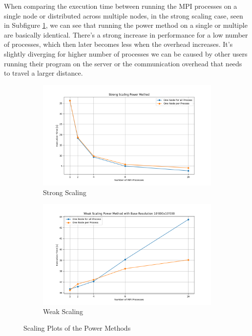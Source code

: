When comparing the execution time between running the MPI processes on a single node or distributed across multiple nodes, in the strong scaling case, seen in Subfigure \ref{fig:strong}, we can see that running the power method on a single or multiple are basically identical. There's a strong increase in performance for a low number of processes, which then later becomes less when the overhead increases. It's slightly diverging for higher number of processes we can be caused by other users running their program on the server or the communication overhead that needs to travel a larger distance.
\begin{figure}[H]
    \centering
    \begin{subfigure}[b]{0.8\textwidth}
        \centering
	\includegraphics[width=\textwidth]{../media/strong_scaling.png}
	\caption{Strong Scaling}
	\label{fig:strong}
    \end{subfigure}
    \hfill 
    \begin{subfigure}[b]{0.8\textwidth}
        \centering
\includegraphics[width=\textwidth]{../media/weak_scaling.png}
	\caption{Weak Scaling}
	\label{fig:weak}

    \end{subfigure}
    \caption{Scaling Plots of the Power Methods}
    \label{fig:scaling}
\end{figure}
